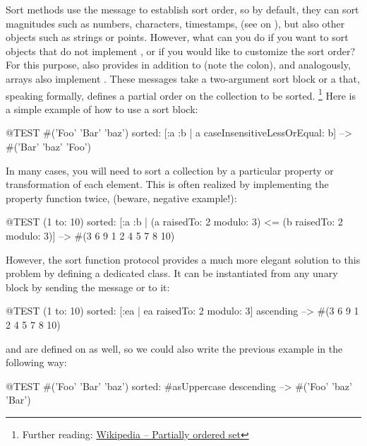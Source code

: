 \documentclass[a4paper,10pt,twoside]{book}
\begin{document}
Sort methods use the message  to establish sort order, so by default, they can sort magnitudes such as numbers, characters, timestamps, \etc (see  on ), but also other objects such as strings or points.
However, what can you do if you want to sort objects that do not implement \ct{<=}, or if you would like to customize the sort order?
For this purpose,  also provides  in addition to  (note the colon), and analogously, arrays \etc also implement .
These messages take a two-argument sort block or a  that, speaking formally, defines a partial order on the collection to be sorted.%
\footnote{Further reading: \href{https://en.wikipedia.org/wiki/Partially_ordered_set}{Wikipedia -- Partially ordered set}}
Here is a simple example of how to use a sort block:

\begin{code}{@TEST}
#('Foo' 'Bar' 'baz') sorted: [:a :b | a caseInsensitiveLessOrEqual: b] --> #('Bar' 'baz' 'Foo')
\end{code}

In many cases, you will need to sort a collection by a particular property or transformation of each element.
This is often realized by implementing the property function twice, \eg* (beware, negative example!):
\begin{code}{@TEST}
(1 to: 10) sorted: [:a :b | (a raisedTo: 2 modulo: 3) <= (b raisedTo: 2 modulo: 3)] --> #(3 6 9 1 2 4 5 7 8 10)
\end{code}

However, the sort function protocol provides a much more elegant solution to this problem by defining a dedicated  class.
It can be instantiated from any unary block by sending the message  or  to it:

\begin{code}{@TEST}
(1 to: 10) sorted: [:ea | ea raisedTo: 2 modulo: 3] ascending --> #(3 6 9 1 2 4 5 7 8 10)
\end{code}

 and  are defined on  as well, so we could also write the previous example in the following way:

\begin{code}{@TEST}
#('Foo' 'Bar' 'baz') sorted: #asUppercase descending --> #('Foo' 'baz' 'Bar')
\end{code}
\end{document}
